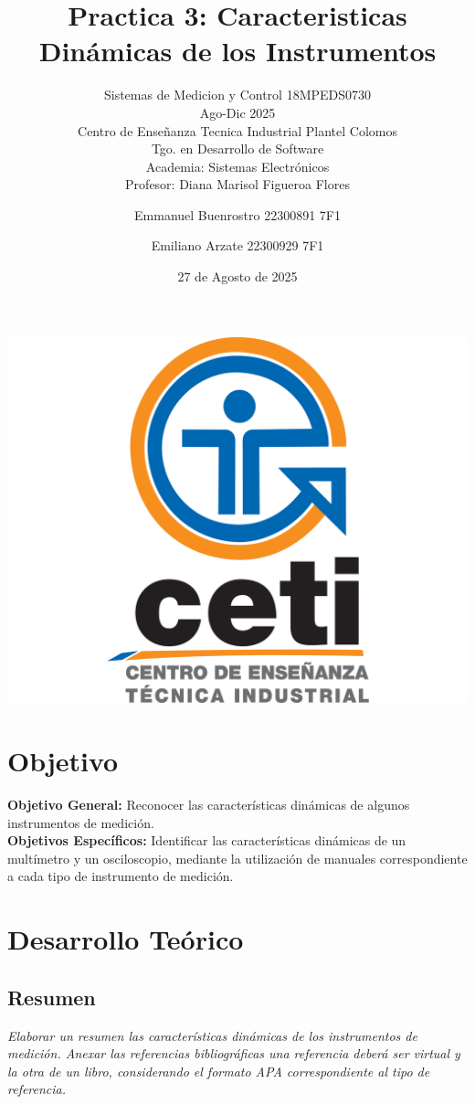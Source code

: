 \documentclass[11pt]{scrartcl}
\title {Practica 3: Caracteristicas Dinámicas de los Instrumentos}
\subtitle{Sistemas de Medicion y Control 18MPEDS0730 \\ Ago-Dic 2025 \\ Centro de Enseñanza Tecnica Industrial Plantel Colomos\\Tgo. en Desarrollo de Software \\ Academia: Sistemas Electrónicos\\Profesor: Diana Marisol Figueroa Flores }
\date{27 de Agosto de 2025}
\author{Emmanuel Buenrostro 22300891 7F1 \\ \and Emiliano Arzate 22300929 7F1 \\}
\newcommand{\indicacion}[1]{\noindent\textit{\small #1}}
\begin{document}
\maketitle
\begin{center}
   \includegraphics[scale=0.15]{../../cetilogo.jpg} 
\end{center}
\newpage


\section{Objetivo}

\textbf{Objetivo General:}
Reconocer las características dinámicas de algunos instrumentos de medición.
\\


\textbf{Objetivos Específicos:} 
Identificar las características dinámicas de un multímetro y un osciloscopio, mediante la utilización de manuales correspondiente a cada tipo de instrumento de medición.

\section{Desarrollo Teórico}

\subsection{Resumen }

\indicacion{
   Elaborar un resumen las características dinámicas de los instrumentos de medición. Anexar las referencias bibliográficas una referencia deberá ser virtual y la otra de un libro, considerando el formato APA correspondiente al tipo de referencia.
}
\end{document}
